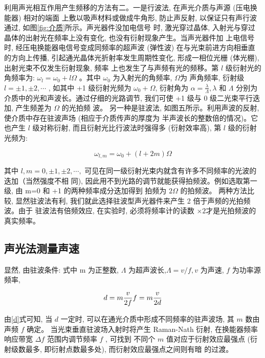 \documentclass{buaaemp}
\begin{document}
利用声光相互作用产生频移的方法有二。一是行波法, 在声光介质与声源 (压电换能器) 相对的端面 上敷以吸声材料或做成牛角形, 防止声反射, 以保证只有声行波通过, 如图\ref{fig:介质}所示。声光器件没加电信号 时, 激光穿过晶体, 入射光与穿过晶体的出射光在频率上没有变化, 也没有衍射现象产生。当声光器件加 上电信号时, 经压电换能器电信号变成同频率的超声波 (弹性波) 在与光束前进方向相垂直的方向上传播, 引起通光晶体光折射率发生周期性变化, 形成一相位光栅 (体光棚), 出射光束不仅发生衍射现象, 频率 上也发生了与声频有光的频移。第  $l $ 级衍射光的角频率为:  $\omega_{l}=\omega_{0}+l \Omega $ 。其中 $ \omega_{0}$  为入射光的角频率,  $\Omega  $为 声角频率, 衍射级 $ l=\pm 1, \pm 2, \cdots$ , 如其中  +1  级衍射光频为  $\omega_{0}+\Omega $, 衍射角为  $\alpha=\frac{\lambda}{\Lambda}, \lambda$  和  $\Lambda$  分别为介质中的光和声波长。通过仔细的光路调节, 我们可使  +1  级与 0 级二光束平行迭加, 产生频差为 $ \Omega$  的光拍频 波。
另一种是驻波法, 如图五所示。利用声波的反射, 使介质中存在驻波声场 (相应于介质传声的厚度为 半声波长的整数倍的情况)。它也产生  $l$  级对称衍射, 而且衍射光比行波法时强得多 (衍射效率高), 第  $l$  级的衍射光频为:

\begin{equation}
    \omega_{l, m}=\omega_{0}+(l+2 m) \Omega
\end{equation}

其中 $ l, m=0, \pm 1, \pm 2, \cdots ,$ 可见在同一级衍射光束内就含有许多不同频率的光波的迭加（当然强度不相 同), 因此用不到光路的调节就能获得拍频波。例如选取第一级, 由  m=0  和  +1  的两种频率成分迭加得到 拍频为 $ 2 \Omega$  的拍频波。
两种方法比较, 显然驻波法有利, 我们就此选择驻波型声光器件来产生 2 倍于声频的光拍频波。由于 驻波法有倍频效应, 在实验时, 必须将频率计的读数  $\times 2  $才是光拍频波的真实频率。\cite{安毓英2003光电子技术}

\subsection{声光法测量声速}
显然, 由驻波条件:
式中  m  为正整数, $ \Lambda $ 为超声波长,$  \Lambda=v / f, v$  为声速,  $f $ 为功率源频率, 

\begin{equation}\label{d}
    d=m \frac{v}{2 f}  \\
    f=m \frac{v}{2 d} 
\end{equation}

由\ref{d}式可知, 当  $d $ 一定时, 可以在通光介质中形成不同频率的驻声波场, 其  $m$  数由声频 $ f$  确定。 当光束垂直驻波场入射时将产生 Raman-Nath 衍射, 在换能器频率响应带宽 $ \Delta f $ 范围内调节频率 $ f$ , 可找到 不同个 $ m$  值对应于衍射效应最强点 (衍射级数最多, 即衍射点数最多处), 而衍射效应最强点之间则有暗 的过渡。
\end{document}

